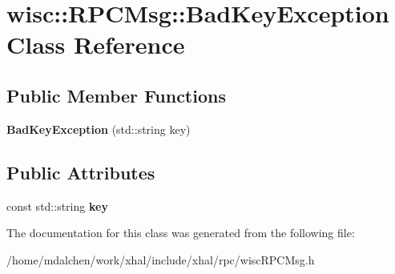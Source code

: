 \hypertarget{classwisc_1_1RPCMsg_1_1BadKeyException}{
\section{wisc::RPCMsg::BadKeyException Class Reference}
\label{classwisc_1_1RPCMsg_1_1BadKeyException}
}
\subsection*{Public Member Functions}
\begin{DoxyCompactItemize}
\item 
\hypertarget{classwisc_1_1RPCMsg_1_1BadKeyException_ad30ad763e3215c29e121d30cc9a741c2}{
{\bfseries BadKeyException} (std::string key)}
\label{classwisc_1_1RPCMsg_1_1BadKeyException_ad30ad763e3215c29e121d30cc9a741c2}

\end{DoxyCompactItemize}
\subsection*{Public Attributes}
\begin{DoxyCompactItemize}
\item 
\hypertarget{classwisc_1_1RPCMsg_1_1BadKeyException_ac8df82b8f57646f7bb8b2e96c8e003a9}{
const std::string {\bfseries key}}
\label{classwisc_1_1RPCMsg_1_1BadKeyException_ac8df82b8f57646f7bb8b2e96c8e003a9}

\end{DoxyCompactItemize}


The documentation for this class was generated from the following file:\begin{DoxyCompactItemize}
\item 
/home/mdalchen/work/xhal/include/xhal/rpc/wiscRPCMsg.h\end{DoxyCompactItemize}
